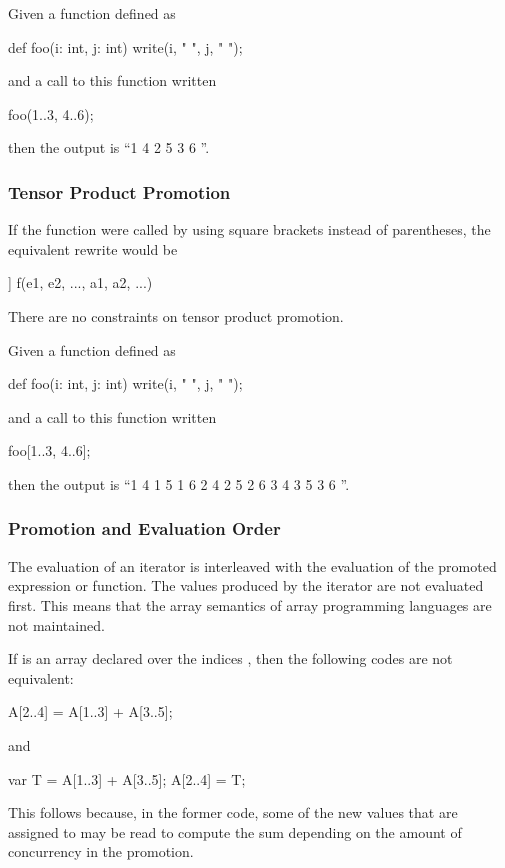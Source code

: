 \begin{example}
Given a function defined as
\begin{chapel}
def foo(i: int, j: int) {
  write(i, " ", j, " ");
}
\end{chapel}
and a call to this function written
\begin{chapel}
foo(1..3, 4..6);
\end{chapel}
then the output is ``1 4 2 5 3 6 ''.
\end{example}

\subsubsection{Tensor Product Promotion}
\label{Tensor_Product_Promotion}

If the function  were called by using square brackets instead
of parentheses, the equivalent rewrite would be
\begin{chapel}
[(e1, e2, ...) in [s1, s2, ...]] f(e1, e2, ..., a1, a2, ...)
\end{chapel}
There are no constraints on tensor product promotion.

\begin{example}
Given a function defined as
\begin{chapel}
def foo(i: int, j: int) {
  write(i, " ", j, " ");
}
\end{chapel}
and a call to this function written
\begin{chapel}
foo[1..3, 4..6];
\end{chapel}
then the output is ``1 4 1 5 1 6 2 4 2 5 2 6 3 4 3 5 3 6 ''.
\end{example}

\subsubsection{Promotion and Evaluation Order}

The evaluation of an iterator is interleaved with the evaluation of
the promoted expression or function.  The values produced by the
iterator are not evaluated first.  This means that the array semantics
of array programming languages are not maintained.

\begin{example}
If  is an array declared over the indices , then
the following codes are not equivalent:
\begin{chapel}
A[2..4] = A[1..3] + A[3..5];
\end{chapel}
and
\begin{chapel}
var T = A[1..3] + A[3..5];
A[2..4] = T;
\end{chapel}
This follows because, in the former code, some of the new values that
are assigned to  may be read to compute the sum depending on
the amount of concurrency in the promotion.
\end{example}

